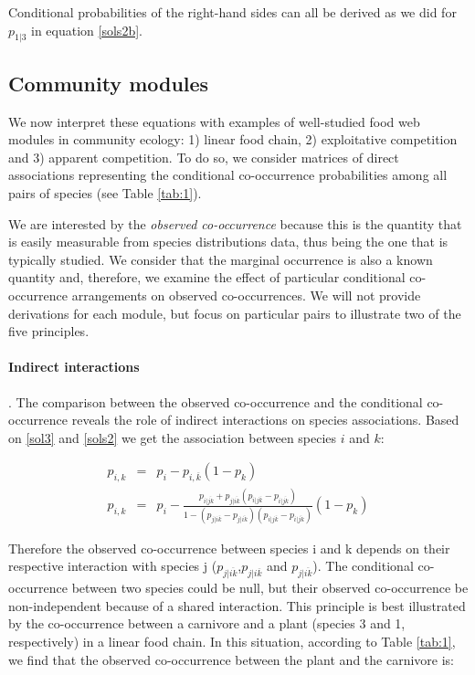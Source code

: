 Conditional probabilities of the right-hand sides can all be derived as we did for $p_{1|3}$ in equation \eqref{sols2b}.



\subsection*{Community modules}
\label{modules}

We now interpret these equations with examples of well-studied food web modules in
community ecology: 1) linear food chain, 2) exploitative competition and 3)
apparent competition. To do so, we consider matrices of direct
associations representing the conditional co-occurrence probabilities among all
pairs of species (see Table \ref{tab:1}).

We are interested by the \emph{observed co-occurrence} because this is the quantity that is easily measurable from species distributions data, thus being the one that is typically studied. We consider that the marginal occurrence is also a known quantity and, therefore, we examine the effect of particular conditional co-occurrence arrangements on observed co-occurrences. We will not provide derivations for each module, but focus on particular pairs to illustrate two of the five principles.

\paragraph{Indirect interactions}. The comparison between the observed
co-occurrence and the conditional co-occurrence reveals the role of indirect
interactions on species associations. Based on \eqref{sol3} and \eqref{sols2}
we get the association between species $i$ and $k$:

\begin{eqnarray}
  \nonumber p_{i,k} &=& p_i-p_{i,\overline{k}}(1-p_k) \\
  p_{i,k}&=& p_i-\frac{p_{i|\overline{jk}}+ p_{j|\overline{ik}} (p_{i|j\overline{k}}- p_{i|\overline{jk}})}{1- (p_{j|i\overline{k}}-p_{j|\overline{ik}})( p_{i|j\overline{k}} - p_{i|\overline{jk}})}(1-p_k)
\end{eqnarray}

Therefore the observed co-occurrence between species i and k depends on their
respective interaction with species j
($p_{j|\overline{ik}}$,$p_{j|i\overline{k}}$ and $p_{j|\overline{ik}}$). The
conditional co-occurrence between two species could be null, but their
observed co-occurrence be non-independent because of a shared interaction.
This principle is best illustrated by the co-occurrence between a carnivore
and a plant (species 3 and 1, respectively) in a linear food chain. In
this situation, according to Table \ref{tab:1}, we find that the observed co-occurrence
between the plant and the carnivore is:

